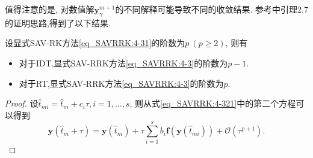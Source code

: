 值得注意的是, 对数值解$\bm{y}_\gamma^{m+1}$的不同解释可能导致不同的收敛结果.
参考\cite{ranochaGeneralRelaxationMethods2020}中引理2.7的证明思路,得到了以下结果.

\begin{theorem}\label{thm_SAVRRK:5_4}
设显式SAV-RK方法\eqref{eq_SAVRRK:4-31}的阶数为$p~(p \geq 2)$, 则有
\begin{itemize}
\item 对于IDT,显式SAV-RRK方法\eqref{eq_SAVRRK:4-3}的阶数为$p-1$.
\item 对于RT,显式SAV-RRK方法\eqref{eq_SAVRRK:4-3}的阶数为$p$.
\end{itemize}
\end{theorem}


\begin{proof}
设$\hat{t}_{m i}=\hat{t}_m+c_i\tau, i=1, \ldots, s$,
则从式\eqref{eq_SAVRRK:4-321}中的第二个方程可以得到
\begin{equation}\label{eq_SAVRRK:4-321b}
\bm{y}\left(\hat{t}_m+\tau\right)=\bm{y}\left(\hat{t}_m\right)+\tau \sum_{i=1}^s b_i \bm{f}\left(\bm{y}\left(\hat{t}_{m i}\right)\right)+\mathcal{O}\left(\tau^{p+1}\right).
\end{equation}


\end{proof}
